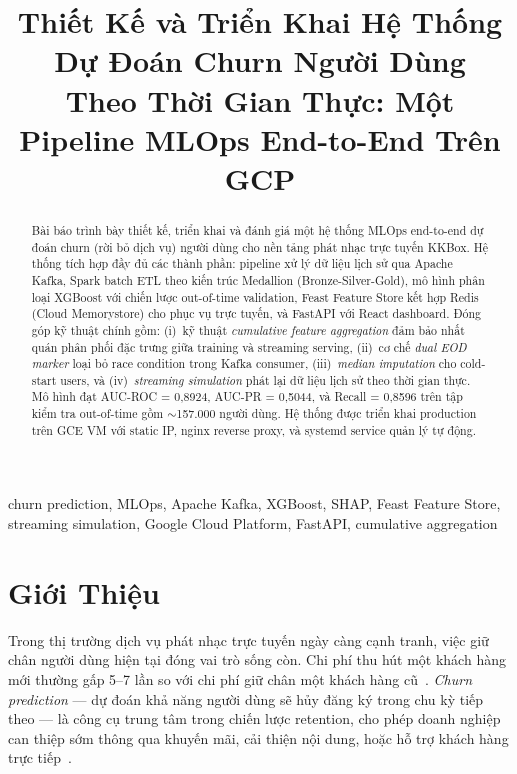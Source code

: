 \documentclass[conference]{IEEEtran}
\begin{document}
\title{Thiết Kế và Triển Khai Hệ Thống Dự Đoán Churn Người Dùng\\
Theo Thời Gian Thực: Một Pipeline MLOps End-to-End Trên GCP}

\author{
}

\maketitle

\begin{abstract}
Bài báo trình bày thiết kế, triển khai và đánh giá một hệ thống MLOps
end-to-end dự đoán churn (rời bỏ dịch vụ) người dùng cho nền tảng phát nhạc
trực tuyến KKBox. Hệ thống tích hợp đầy đủ các thành phần: pipeline xử lý
dữ liệu lịch sử qua Apache Kafka, Spark batch ETL theo kiến trúc Medallion
(Bronze-Silver-Gold), mô hình phân loại XGBoost với chiến lược out-of-time
validation, Feast Feature Store kết hợp Redis (Cloud Memorystore) cho phục vụ
trực tuyến, và FastAPI với React dashboard. Đóng góp kỹ thuật chính gồm:
(i)~kỹ thuật \emph{cumulative feature aggregation} đảm bảo nhất quán phân
phối đặc trưng giữa training và streaming serving, (ii)~cơ chế \emph{dual
EOD marker} loại bỏ race condition trong Kafka consumer, (iii)~\emph{median
imputation} cho cold-start users, và (iv)~\emph{streaming simulation} phát
lại dữ liệu lịch sử theo thời gian thực. Mô hình đạt AUC-ROC = 0,8924,
AUC-PR = 0,5044, và Recall = 0,8596 trên tập kiểm tra out-of-time gồm
$\sim$157.000 người dùng. Hệ thống được triển khai production trên GCE VM
với static IP, nginx reverse proxy, và systemd service quản lý tự động.
\end{abstract}

\begin{IEEEkeywords}
churn prediction, MLOps, Apache Kafka, XGBoost, SHAP, Feast Feature Store,
streaming simulation, Google Cloud Platform, FastAPI, cumulative aggregation
\end{IEEEkeywords}

\section{Giới Thiệu}
\label{sec:intro}

Trong thị trường dịch vụ phát nhạc trực tuyến ngày càng cạnh tranh, việc giữ
chân người dùng hiện tại đóng vai trò sống còn. Chi phí thu hút một khách
hàng mới thường gấp 5–7 lần so với chi phí giữ chân một khách hàng cũ~\cite{reichheld1996loyalty}. \emph{Churn prediction} — dự đoán khả năng người
dùng sẽ hủy đăng ký trong chu kỳ tiếp theo — là công cụ trung tâm trong
chiến lược retention, cho phép doanh nghiệp can thiệp sớm thông qua khuyến
mãi, cải thiện nội dung, hoặc hỗ trợ khách hàng trực tiếp~\cite{hadden2007computer}.
\end{document}
